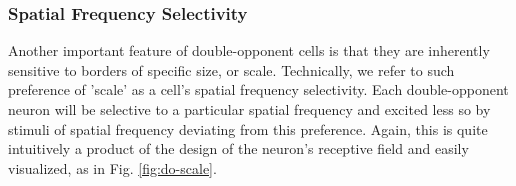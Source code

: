 \documentclass[journal,onecolumn]{IEEEtran}
\begin{document}
\subsubsection*{Spatial Frequency Selectivity}

Another important feature of double-opponent cells is that they are inherently sensitive to borders of specific size, or scale. Technically, we refer to such preference of 'scale' as a cell's spatial frequency selectivity. Each double-opponent neuron will be selective to a particular spatial frequency and excited less so by stimuli of spatial frequency deviating from this preference. Again, this is quite intuitively a product of the design of the neuron's receptive field and easily visualized, as in Fig. \ref{fig:do-scale}.

\end{document}
